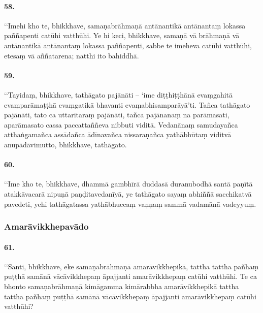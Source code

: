 \paragraph{58.}
‘‘Imehi kho te, bhikkhave, samaṇabrāhmaṇā antānantikā antānantaṃ lokassa paññapenti catūhi vatthūhi. Ye hi keci, bhikkhave, samaṇā vā brāhmaṇā vā antānantikā antānantaṃ lokassa paññapenti, sabbe te imeheva catūhi vatthūhi, etesaṃ vā aññatarena; natthi ito bahiddhā.

\paragraph{59.}
‘‘Tayidaṃ, bhikkhave, tathāgato pajānāti – ‘ime diṭṭhiṭṭhānā evaṃgahitā evaṃparāmaṭṭhā evaṃgatikā bhavanti evaṃabhisamparāyā’ti. Tañca tathāgato pajānāti, tato ca uttaritaraṃ pajānāti, tañca pajānanaṃ na parāmasati, aparāmasato cassa paccattaññeva nibbuti viditā. Vedanānaṃ samudayañca atthaṅgamañca assādañca ādīnavañca nissaraṇañca yathābhūtaṃ viditvā anupādāvimutto, bhikkhave, tathāgato.

\paragraph{60.}
‘‘Ime kho te, bhikkhave, dhammā gambhīrā duddasā duranubodhā santā paṇītā atakkāvacarā nipuṇā paṇḍitavedanīyā, ye tathāgato sayaṃ abhiññā sacchikatvā pavedeti, yehi tathāgatassa yathābhuccaṃ vaṇṇaṃ sammā vadamānā vadeyyuṃ.

\subsubsection{Amarāvikkhepavādo}

\paragraph{61.}
‘‘Santi, bhikkhave, eke samaṇabrāhmaṇā amarāvikkhepikā, tattha tattha pañhaṃ puṭṭhā samānā vācāvikkhepaṃ āpajjanti amarāvikkhepaṃ catūhi vatthūhi. Te ca bhonto samaṇabrāhmaṇā kimāgamma kimārabbha amarāvikkhepikā tattha tattha pañhaṃ puṭṭhā samānā vācāvikkhepaṃ āpajjanti amarāvikkhepaṃ catūhi vatthūhi?

